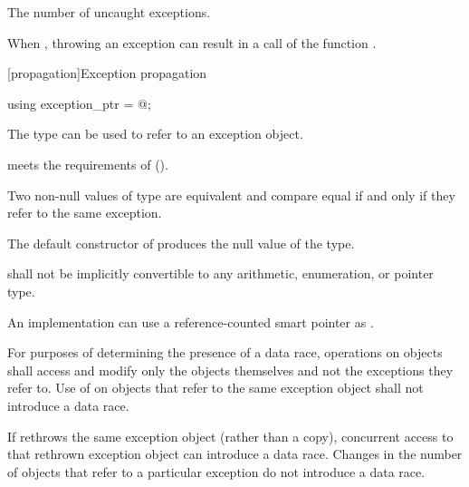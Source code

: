 \begin{itemdescr}
\pnum
\returns
The number of uncaught exceptions.

\pnum
\remarks
When ,
throwing an exception can result in a call of the function
.
\end{itemdescr}

[propagation]{Exception propagation}

%
\begin{itemdecl}
using exception_ptr = @\unspec@;
\end{itemdecl}

\begin{itemdescr}
\pnum
The type  can be used to refer to an exception object.

\pnum
{} meets the requirements of
 ().

\pnum
Two non-null values of type  are equivalent and compare equal if and
only if they refer to the same exception.

\pnum
The default constructor of  produces the null value of the
type.

\pnum
{} shall not be implicitly convertible to any arithmetic,
enumeration, or pointer type.

\pnum
\begin{note}
An implementation can use a reference-counted smart
pointer as .
\end{note}

\pnum
For purposes of determining the presence of a data race, operations on
 objects shall access and modify only the
 objects themselves and not the exceptions they refer to.
Use of  on  objects that refer to
the same exception object shall not introduce a data race.
\begin{note}
If
 rethrows the same exception object (rather than a copy),
concurrent access to that rethrown exception object can introduce a data race.
Changes in the number of  objects that refer to a
particular exception do not introduce a data race.
\end{note}
\end{itemdescr}

